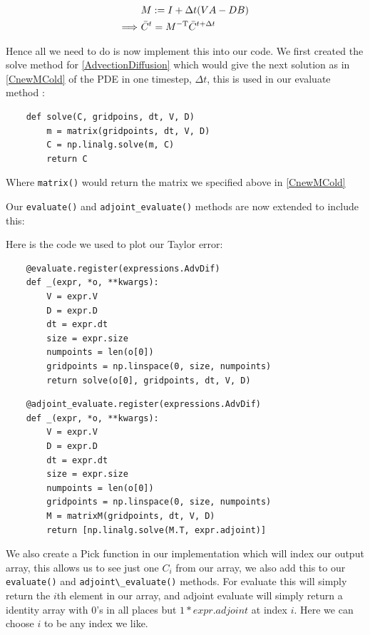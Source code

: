 \documentclass{article}
\begin{document}
\begin{equation} \label{PDEadjoint}
    \begin{split}
        & M := I + \Delta t(VA - DB) \\
        \Longrightarrow \ &  \Bar{C}^{t} = M^{-\text{T}} \Bar{C}^{t+\Delta t}
    \end{split}
\end{equation}

Hence all we need to do is now implement this into our code. We first created the solve method for \eqref{AdvectionDiffusion} which would give the next solution as in \eqref{CnewMCold} of the PDE in one timestep, $\Delta t$, this is used in our evaluate method \cite{github}:

\begin{verbatim}
    def solve(C, gridpoins, dt, V, D)
        m = matrix(gridpoints, dt, V, D)
        C = np.linalg.solve(m, C)
        return C
\end{verbatim}

Where \verb|matrix()| would return the matrix we specified above in \eqref{CnewMCold}

Our \verb|evaluate()| and \verb|adjoint_evaluate()| methods are now extended \cite{github} to include this:


Here is the code we used to plot our Taylor error:

\begin{verbatim}
    @evaluate.register(expressions.AdvDif)
    def _(expr, *o, **kwargs):
        V = expr.V
        D = expr.D
        dt = expr.dt
        size = expr.size
        numpoints = len(o[0])
        gridpoints = np.linspace(0, size, numpoints)
        return solve(o[0], gridpoints, dt, V, D)
\end{verbatim}

\begin{verbatim}
    @adjoint_evaluate.register(expressions.AdvDif)
    def _(expr, *o, **kwargs):
        V = expr.V
        D = expr.D
        dt = expr.dt
        size = expr.size
        numpoints = len(o[0])
        gridpoints = np.linspace(0, size, numpoints)
        M = matrixM(gridpoints, dt, V, D)
        return [np.linalg.solve(M.T, expr.adjoint)]
\end{verbatim}

We also create a Pick function \cite{github} in our implementation which will index our output array, this allows us to see just one $C_i$ from our array, we also add this to our \verb|evaluate()| and \verb|adjoint\_evaluate()| methods. For evaluate this will simply return the $i$th element in our array, and adjoint evaluate will simply return a identity array with 0's in all places but $1*expr.adjoint$ at index $i$. Here we can choose $i$ to be any index we like.
\end{document}
